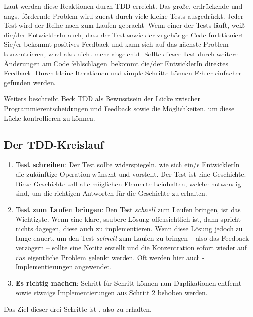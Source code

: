 Laut \cite{Beck:2003} werden diese Reaktionen durch TDD erreicht. Das große, erdrückende und angst-fördernde Problem wird zuerst durch viele kleine Tests ausgedrückt. Jeder Test wird der Reihe nach zum Laufen gebracht. Wenn einer der Tests läuft, weiß die/der EntwicklerIn auch, dass der Test sowie der zugehörige Code funktioniert. Sie/er bekommt positives Feedback und kann sich auf das nächste Problem konzentrieren, wird also nicht mehr abgelenkt. Sollte dieser Test durch weitere Änderungen am Code fehlschlagen, bekommt die/der EntwicklerIn direktes Feedback. Durch kleine Iterationen und simple Schritte können Fehler einfacher gefunden werden.

Weiters beschreibt Beck TDD als Bewusstsein der Lücke zwischen Programmierentscheidungen und Feedback sowie die Möglichkeiten, um diese Lücke kontrollieren zu können.

\subsection{Der TDD-Kreislauf}
\begin{enumerate}
  \item \textbf{Test schreiben}:\newline
  Der Test sollte widerspiegeln, wie sich ein/e EntwicklerIn die zukünftige Operation wünscht und vorstellt. Der Test ist eine Geschichte. Diese Geschichte soll alle möglichen Elemente beinhalten, welche notwendig sind, um die richtigen Antworten für die Geschichte zu erhalten.
  \item \textbf{Test zum Laufen bringen}:\newline
  Den Test \textit{schnell} zum Laufen bringen, ist das Wichtigste. Wenn eine klare, saubere Lösung offensichtlich ist, dann spricht nichts dagegen, diese auch zu implementieren. Wenn diese Lösung jedoch zu lange dauert, um den Test \textit{schnell} zum Laufen zu bringen -- also das  Feedback verzögern -- sollte eine Notitz erstellt und die Konzentration sofort wieder auf das eigentliche Problem gelenkt werden. Oft werden hier auch -Implementierungen angewendet.
  \item \textbf{Es richtig machen}:\newline
  Schritt für Schritt können nun Duplikationen entfernt sowie etwaige  Implementierungen aus Schritt 2 behoben werden.
\end{enumerate}

Das Ziel dieser drei Schritte ist , also  zu erhalten.


